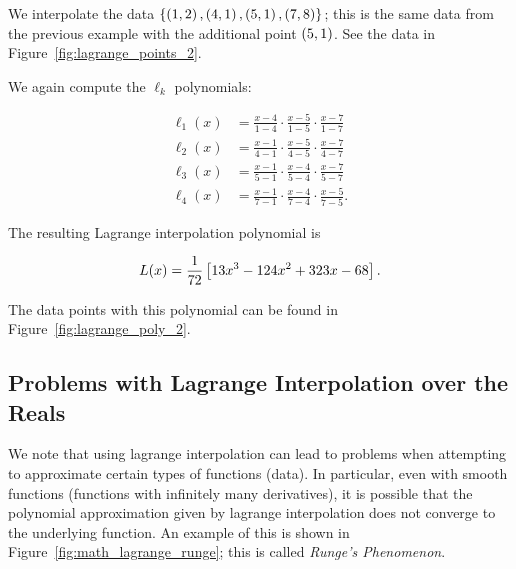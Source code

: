 \begin{example}
\label{example:math_lagrange_reals_2}

We interpolate the data
$\left\{ \left( 1,2 \right),\left( 4,1 \right),\left( 5,1 \right),\left( 7,8 \right) \right\}$;
this is the same data from the previous example with the additional
point $\left( 5,1 \right)$.
See the data in Figure~\ref{fig:lagrange_points_2}.



We again compute the $\ell_{k}$ polynomials:

\begin{align}
    \ell_{1}(x) &= \frac{x-4}{1-4}\cdot\frac{x-5}{1-5}\cdot\frac{x-7}{1-7}
        \nonumber\\
    \ell_{2}(x) &= \frac{x-1}{4-1}\cdot\frac{x-5}{4-5}\cdot\frac{x-7}{4-7}
        \nonumber\\
    \ell_{3}(x) &= \frac{x-1}{5-1}\cdot\frac{x-4}{5-4}\cdot\frac{x-7}{5-7}
        \nonumber\\
    \ell_{4}(x) &= \frac{x-1}{7-1}\cdot\frac{x-4}{7-4}\cdot\frac{x-5}{7-5}.
\end{align}

\noindent
The resulting Lagrange interpolation polynomial is

\begin{equation}
    L(x) = \frac{1}{72}\left[ 13x^{3} - 124x^{2} + 323x - 68 \right].
\end{equation}

\noindent
The data points with this polynomial can be found in
Figure~\ref{fig:lagrange_poly_2}.
\end{example}

\subsection{Problems with Lagrange Interpolation over the Reals}

We note that using \gls{lagrange interpolation} can lead to problems
when attempting to approximate certain types of \glspl{function} (data).
In particular, even with smooth functions
(functions with infinitely many derivatives),
it is possible that the polynomial approximation given by
\gls{lagrange interpolation} does not converge to the underlying function.
An example of this is shown in Figure~\ref{fig:math_lagrange_runge};
this is called \emph{Runge's Phenomenon}.



